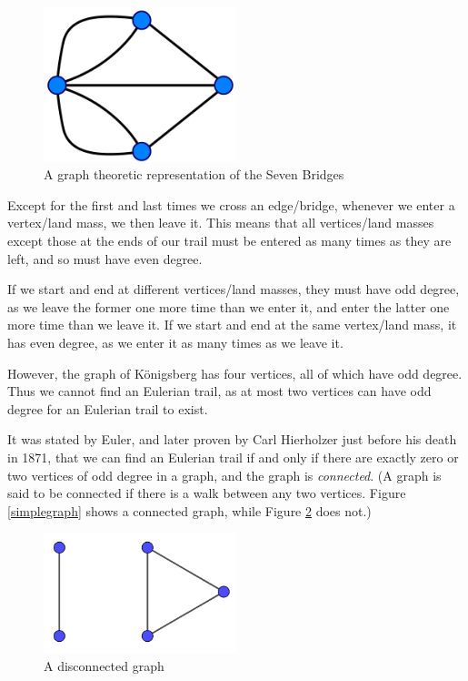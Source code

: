 	\begin{figure}[h]
		\centering
		\includegraphics[width=0.5\textwidth]{Konigsberggraph}
		\caption{A graph theoretic representation of the Seven Bridges}
		\label{Konigsberggraph}
	\end{figure}
	
	Except for the first and last times we cross an edge/bridge, whenever we enter a vertex/land mass, we then leave it. This means that all vertices/land masses except those at the ends of our trail must be entered as many times as they are left, and so must have even degree.
	
	If we start and end at different vertices/land masses, they must have odd degree, as we leave the former one more time than we enter it, and enter the latter one more time than we leave it. If we start and end at the same vertex/land mass, it has even degree, as we enter it as many times as we leave it.
	
	However, the graph of K\"onigsberg has four vertices, all of which have odd degree. Thus we cannot find an Eulerian trail, as at most two vertices can have odd degree for an Eulerian trail to exist.
	
	It was stated by Euler, and later proven by Carl Hierholzer just before his death in 1871, that we can find an Eulerian trail if and only if there are exactly zero or two vertices of odd degree in a graph, and the graph is \textit{connected}. (A graph is said to be connected if there is a walk between any two vertices. Figure \ref{simplegraph} shows a connected graph, while Figure \ref{disconnectedgraph} does not.)
	
	\begin{figure}[h]
		\centering
		\includegraphics[width=0.5\textwidth]{disconnectedgraph}
		\caption{A disconnected graph}
		\label{disconnectedgraph}
	\end{figure}
	
